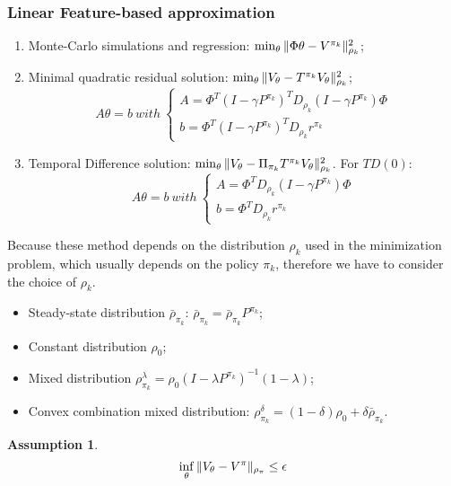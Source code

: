 \documentclass[a4paper]{article}
\newtheorem{assumption}{Assumption}
\begin{document}
\subsubsection{Linear Feature-based approximation}%
\begin{enumerate}
    \item Monte-Carlo simulations and regression: $ \min_{\theta} \Arrowvert \Phi \theta - V^{\pi_k}  \Arrowvert^2_{\rho_k} $;
    \item Minimal quadratic residual solution: $ \min_{\theta} \Arrowvert V_{\theta} - T^{\pi_k} V_{\theta} \Arrowvert^2_{\rho_k} $;
        \[
            A \theta = b\ with\ 
            \begin{cases}
                A = \Phi^T{(I - \gamma P^{\pi_k})}^{T} D_{\rho_k} (I - \gamma P^{\pi_k})\Phi\\
                b = \Phi^T{(I - \gamma P^{\pi_k})}^{T} D_{\rho_k} r^{\pi_k}
            \end{cases}
        \]
    \item Temporal Difference solution: $ \min_{\theta} \Arrowvert V_\theta - \Pi_{\pi_k} T^{\pi_k} V_{\theta} \Arrowvert^2_{\rho_k} $. For $ TD(0) $:
        \[
            A \theta = b\ with\ 
            \begin{cases}
                A = \Phi^T D_{\rho_k} (I - \gamma P^{\pi_k}) \Phi\\
                b = \Phi^T D_{\rho_k} r^{\pi_k}
            \end{cases}
        \]
\end{enumerate}

Because these method depends on the distribution $ \rho_k $ used in the minimization problem, which usually depends on the policy $ \pi_k $, therefore we have to consider the choice of $ \rho_k $.
\begin{itemize}
    \item Steady-state distribution $ \bar\rho_{\pi_k} $: $ \bar\rho_{\pi_k} = \bar\rho_{\pi_k} P^{\pi_k} $;
    \item Constant distribution $ \rho_0 $;
    \item  Mixed distribution $ \rho^{\lambda}_{\pi_k} = \rho_0{( I - \lambda P^{\pi_k})}^{-1}(1 - \lambda) $;
    \item Convex combination mixed distribution: $ \rho^{\delta}_{\pi_k} = (1 - \delta) \rho_0 + \delta \bar \rho_{\pi_k} $.
\end{itemize}
\begin{assumption}
    \[
        \inf_{\theta} \Arrowvert V_{\theta} - V^{\pi} \Arrowvert_{\rho_{\pi}} \le \epsilon
    \]
\end{assumption}
\end{document}
